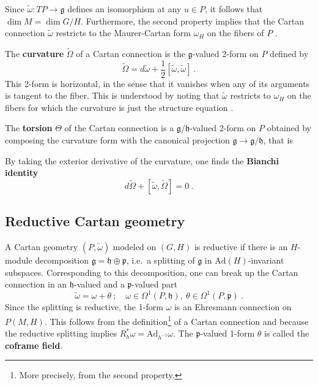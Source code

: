 \documentclass[11pt]{amsart}
\begin{document}
Since $\tilde{\omega} : TP \to \mathfrak{g}$ defines an 
isomorphism at any $u \in P$, it follows that $\dim M = \dim 
G/H$.  Furthermore, the second property implies that the Cartan 
connection $\tilde{\omega}$ restricts to the Maurer-Cartan form 
$\omega_H$ on the fibers of $P$ \cite{sharpe1997diff_geo}.

The \textbf{curvature} $\tilde{\Omega}$ of a Cartan connection is 
the $\mathfrak{g}$-valued 2-form on $P$ defined by
\begin{displaymath}
	\tilde{\Omega} = d\tilde{\omega} + 
	\frac{1}{2}[\tilde{\omega},\tilde{\omega}]~.
\end{displaymath}
This 2-form is horizontal, in the sense that it vanishes when any 
of its arguments is tangent to the fiber. This is understood by 
noting that $\tilde{\omega}$ restricts to $\omega_H$ on the 
fibers for which the curvature is just the structure equation 
\cite{kob1996found}.

The \textbf{torsion} $\Theta$ of the Cartan connection is a 
$\mathfrak{g}/\mathfrak{h}$-valued 2-form on $P$ obtained by 
composing the curvature form with the canonical projection 
$\mathfrak{g} \to \mathfrak{g}/\mathfrak{h}$, that is 

By taking the exterior derivative of the curvature, one finds the 
\textbf{Bianchi identity}
\begin{displaymath}
	d\tilde{\Omega} + [\tilde{\omega},\tilde{\Omega}] = 0~.
\end{displaymath}

\subsection{Reductive Cartan geometry}

A Cartan geometry $(P,\tilde{\omega})$ modeled on $(G,H)$ is 
reductive if there is an $H$-module decomposition $\mathfrak{g} = 
\mathfrak{h} \oplus \mathfrak{p}$, i.e.~a splitting of 
$\mathfrak{g}$ in $\mathrm{Ad}(H)$-invariant subspaces.  
Corresponding to this decomposition, one can break up the Cartan 
connection in an $\mathfrak{h}$-valued and a 
$\mathfrak{p}$-valued part
%
\begin{displaymath}
	\tilde{\omega} = \omega + \theta~;\quad
	\omega \in \Omega^1(P,\mathfrak{h}),~
	\theta \in \Omega^1(P,\mathfrak{p})~.
\end{displaymath}
Since the splitting is reductive, the 1-form $\omega$ is an 
Ehresmann connection on $P(M,H)$. This follows from the 
definition\footnote{More precisely, from the second property.} of 
a Cartan connection and because the reductive splitting implies 
$R^\ast_h \omega = \mathrm{Ad}_{h^{-1}}\omega$. The 
$\mathfrak{p}$-valued 1-form $\theta$ is called the 
\textbf{coframe field}.
\end{document}
